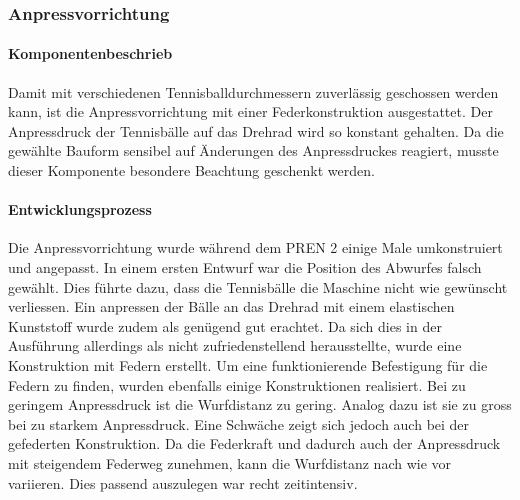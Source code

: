 \subsubsection{Anpressvorrichtung}

\paragraph{Komponentenbeschrieb}
Damit mit verschiedenen Tennisballdurchmessern zuverlässig geschossen werden kann, ist die Anpressvorrichtung mit einer Federkonstruktion ausgestattet. Der Anpressdruck der Tennisbälle auf das Drehrad wird so konstant gehalten. Da die gewählte Bauform sensibel auf Änderungen des Anpressdruckes reagiert, musste dieser Komponente besondere Beachtung geschenkt werden. 

\paragraph{Entwicklungsprozess}
Die Anpressvorrichtung wurde während dem PREN 2 einige Male umkonstruiert und angepasst. In einem ersten Entwurf war die Position des Abwurfes falsch gewählt. Dies führte dazu, dass die Tennisbälle die Maschine nicht wie gewünscht verliessen. Ein anpressen der Bälle an das Drehrad mit einem elastischen Kunststoff wurde zudem als genügend gut erachtet. Da sich dies in der Ausführung allerdings als nicht zufriedenstellend herausstellte, wurde eine Konstruktion mit Federn erstellt. Um eine funktionierende Befestigung für die Federn zu finden, wurden ebenfalls einige Konstruktionen realisiert. Bei zu geringem Anpressdruck ist die Wurfdistanz zu gering. Analog dazu ist sie zu gross bei zu starkem Anpressdruck. Eine Schwäche zeigt sich jedoch auch bei der gefederten Konstruktion. Da die Federkraft und dadurch auch der Anpressdruck mit steigendem Federweg zunehmen, kann die Wurfdistanz nach wie vor variieren. Dies passend auszulegen war recht zeitintensiv.
